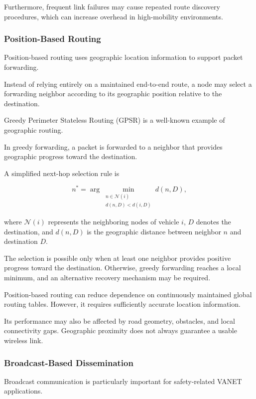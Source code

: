 Furthermore, frequent
link failures may
cause repeated route
discovery procedures,
which can increase
overhead in high-mobility
environments.

\subsubsection{Position-Based Routing}

Position-based routing
uses geographic location
information to support
packet forwarding.

Instead of relying
entirely on a maintained
end-to-end route, a node
may select a forwarding
neighbor according to
its geographic position
relative to the destination.

Greedy Perimeter Stateless
Routing (GPSR) is a
well-known example
of geographic routing.

In greedy forwarding,
a packet is forwarded
to a neighbor that
provides geographic
progress toward
the destination.

A simplified next-hop
selection rule is

\begin{equation}
n^{*} =
\arg\min_{\substack{
n \in \mathcal{N}(i)\\
d(n,D)<d(i,D)
}}
d(n,D),
\label{eq:greedy}
\end{equation}

where $\mathcal{N}(i)$
represents the neighboring
nodes of vehicle $i$,
$D$ denotes the destination,
and $d(n,D)$ is the
geographic distance between
neighbor $n$ and destination $D$.

The selection is possible
only when at least one
neighbor provides positive
progress toward the destination.
Otherwise, greedy forwarding
reaches a local minimum,
and an alternative recovery
mechanism may be required.

Position-based routing
can reduce dependence
on continuously maintained
global routing tables.
However, it requires
sufficiently accurate
location information.

Its performance may
also be affected by
road geometry, obstacles,
and local connectivity
gaps. Geographic proximity
does not always guarantee
a usable wireless link.

\subsubsection{Broadcast-Based Dissemination}

Broadcast communication
is particularly important
for safety-related VANET
applications.

